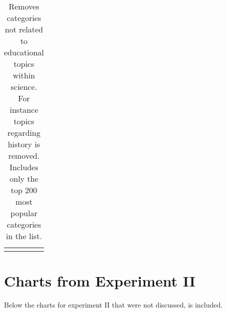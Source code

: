 \begin{appendices}
\begin{longtable} {|| p{20em} | p{5em} ||}
  \hline
\caption{Removes categories not related to educational topics within science. For instance topics regarding history is removed. Includes only the top 200 most popular categories in the list.}
\label{table:whitelistV2}
\end{longtable}


\chapter{Charts from Experiment II} \label{a:ex2}

Below the charts for experiment II that were not discussed, is included.



\end{appendices}
